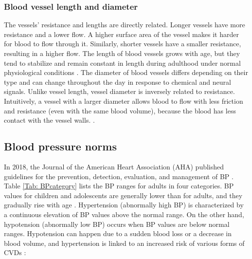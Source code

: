 \documentclass[journal,article,moreauthors]{Definitions/mdpi}
\begin{document}
\subsubsection{Blood vessel length and diameter} The vessels' resistance and lengths are directly related. Longer vessels have more resistance and a lower flow. A higher surface area of the vessel makes it harder for blood to flow through it. Similarly, shorter vessels have a smaller resistance, resulting in a higher flow. The length of blood vessels grows with age, but they tend to stabilize and remain constant in length during adulthood under normal physiological conditions \citep{M10, desaix2013anatomy}.
The diameter of blood vessels differs depending on their type and can change throughout the day in response to chemical and neural signals. Unlike vessel length, vessel diameter is inversely related to resistance. Intuitively, a vessel with a larger diameter allows blood to flow with less friction and resistance (even with the same blood volume), because the blood has less contact with the vessel walls. \citep{desaix2013anatomy, Jeppesen2007-az}.
\subsection{Blood pressure norms}
In 2018, the Journal of the American Heart Association (AHA) published guidelines for the prevention, detection, evaluation, and management of BP \citep{Whelton2018}. Table \ref{Tab: BPcategory}
lists the BP ranges for adults in four categories. BP values for children and adolescents are generally lower than for adults, and they gradually rise with age \citep{azegami2021blood}. Hypertension (abnormally high BP) is characterized by a continuous elevation of BP values above the normal range. On the other hand, hypotension (abnormally low BP) occurs when BP values are below normal ranges. Hypotension can happen due to a sudden blood loss or a decrease in blood volume, and hypertension is linked to an increased risk of various forms of CVDs \citep{Whelton2018}: 
  
\end{document}
